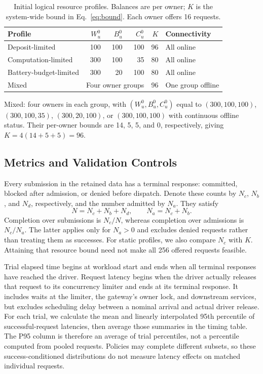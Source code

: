 \begin{table}[t]
\caption{Initial logical resource profiles. Balances are per owner;
$K$ is the system-wide bound in Eq.~\eqref{eq:bound}. Each owner offers 16 requests.}
\label{tab:profiles}
\centering\footnotesize
\setlength{\tabcolsep}{3pt}
\renewcommand{\arraystretch}{1.10}
\begin{tabularx}{\columnwidth}{@{}
>{\raggedright\arraybackslash}X rrrr
>{\raggedright\arraybackslash}p{1.42cm}@{}}
\toprule
Profile & $W_u^0$ & $B_u^0$ & $C_u^0$ & $K$ & Connectivity\\
\midrule
Deposit-limited & 100 & 100 & 100 & 96 & All online\\
Computation-limited & 300 & 100 & 35 & 80 & All online\\
Battery-budget-limited & 300 & 20 & 100 & 80 & All online\\
Mixed & \multicolumn{3}{c}{Four owner groups} & 96 & One group offline\\
\bottomrule
\end{tabularx}
\par\smallskip\raggedright
Mixed: four owners in each group, with $(W_u^0,B_u^0,C_u^0)$ equal to
$(300,100,100)$, $(300,100,35)$, $(300,20,100)$, or $(300,100,100)$ with
continuous offline status. Their per-owner bounds are 14, 5, 5, and 0,
respectively, giving $K=4(14+5+5)=96$.
\end{table}

\subsection{Metrics and Validation Controls}

Every submission in the retained data has a terminal response: committed,
blocked after admission, or denied before dispatch. Denote these counts by
$N_c$, $N_b$, and $N_d$, respectively, and the number admitted by $N_a$.
They satisfy
\[
N=N_c+N_b+N_d,\qquad N_a=N_c+N_b.
\]
Completion over submissions is $N_c/N$, whereas completion over admissions
is $N_c/N_a$. The latter applies only for $N_a>0$ and excludes denied
requests rather than treating them as successes. For static profiles, we
also compare $N_c$ with $K$. Attaining that resource bound need not make
all 256 offered requests feasible.

Trial elapsed time begins at workload start and ends when all terminal
responses have reached the driver. Request latency begins when the driver
actually releases that request to its concurrency limiter and ends at its
terminal response. It includes waits at the limiter, the gateway's owner
lock, and downstream services, but excludes scheduling delay between a
nominal arrival and actual driver release. For each trial, we calculate
the mean and linearly interpolated 95th percentile of successful-request
latencies, then average those summaries in the timing table. The P95 column
is therefore an average of trial percentiles, not a percentile computed
from pooled requests. Policies may complete different subsets, so these
success-conditioned distributions do not measure latency effects on matched
individual requests.

